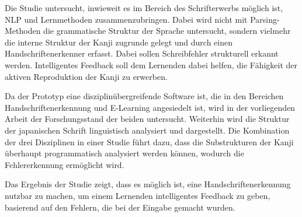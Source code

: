 Die Studie untersucht, inwieweit es im Bereich des Schrifterwerbs möglich ist, 
NLP und Lernmethoden zusammenzubringen. Dabei wird nicht mit Parsing-Methoden 
die grammatische Struktur der Sprache untersucht, sondern vielmehr die interne 
Struktur der Kanji zugrunde gelegt und durch einen Handschriftenerkenner erfasst.
Dabei sollen Schreibfehler strukturell erkannt werden. Intelligentes Feedback 
soll dem Lernenden dabei helfen, die Fähigkeit der aktiven Reproduktion der 
Kanji zu erwerben.

Da der Prototyp eine disziplinübergreifende Software ist, 
die in den Bereichen Handschriftenerkennung und E-Learning angesiedelt ist,
wird in der vorliegenden Arbeit der Forschungsstand der beiden untersucht.
Weiterhin wird die Struktur der japanischen Schrift linguistisch analysiert und
dargestellt. Die Kombination der drei Disziplinen in einer Studie führt dazu, 
dass die Substrukturen der Kanji überhaupt programmatisch analysiert werden 
können, wodurch die Fehlererkennung ermöglicht wird.

Das Ergebnis der Studie zeigt, dass es möglich ist, eine Handschriftenerkennung
nutzbar zu machen, um einem Lernenden intelligentes Feedback zu geben,
basierend auf den Fehlern, die bei der Eingabe gemacht wurden.



